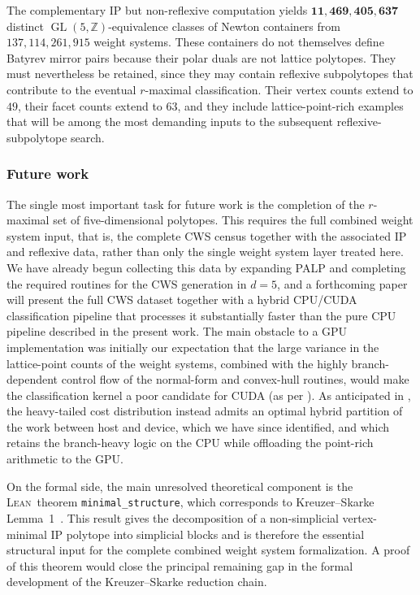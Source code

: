 \documentclass[appliedmath,article,submit,moreauthors]{Definitions/mdpi}
\newcommand{\Z}{\mathbb{Z}}
\newcommand{\GL}{\operatorname{GL}}
\newcommand{\Lean}{\textsc{Lean}}
\begin{document}
The complementary IP but non-reflexive computation yields
\(\mathbf{11{,}469{,}405{,}637}\) distinct \(\GL(5,\Z)\)-equivalence classes of
Newton containers from \(137{,}114{,}261{,}915\) weight systems. These
containers do not themselves define Batyrev mirror pairs because their polar
duals are not lattice polytopes. They must nevertheless be retained, since they
may contain reflexive subpolytopes that contribute to the eventual \(r\)-maximal
classification. Their vertex counts extend to \(49\), their facet counts extend
to \(63\), and they include lattice-point-rich examples that will be among the
most demanding inputs to the subsequent reflexive-subpolytope search.

\subsubsection{Future work}

The single most important task for future work is the completion of the
\(r\)-maximal set of five-dimensional polytopes. This requires the full
combined weight system input, that is, the complete CWS census together with the
associated IP and reflexive data, rather than only the single weight system
layer treated here. We have already begun collecting this data by expanding PALP
and completing the required routines for the CWS generation in $d=5$, and a
forthcoming paper will present the full CWS dataset together with a hybrid
CPU/CUDA classification pipeline that processes it substantially faster than the
pure CPU pipeline described in the present work. The main obstacle to a GPU
implementation was initially our expectation that the large variance in the
lattice-point counts of the weight systems, combined with the highly
branch-dependent control flow of the normal-form and convex-hull routines, would
make the classification kernel a poor candidate for CUDA (as per
). As anticipated in , the
heavy-tailed cost distribution instead admits an optimal hybrid partition of the
work between host and device, which we have since identified, and which retains
the branch-heavy logic on the CPU while offloading the point-rich arithmetic to
the GPU.

On the formal side, the main unresolved theoretical component is the
\Lean\ theorem \nolinkurl{minimal_structure}, which corresponds to
Kreuzer--Skarke Lemma~1~\cite{KS97}. This result gives the decomposition of a
non-simplicial vertex-minimal IP polytope into simplicial blocks and is
therefore the essential structural input for the complete combined weight system
formalization. A proof of this theorem would close the principal remaining gap
in the formal development of the Kreuzer--Skarke reduction chain.
\end{document}

